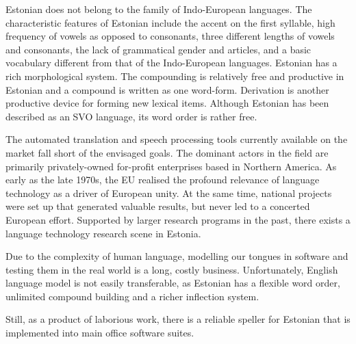 \begin{multicols}{2}
Estonian does not belong to the family of Indo-European languages. 
The characteristic features of Estonian include the accent on the ﬁrst syllable, high frequency of vowels as opposed to consonants, three different lengths of vowels and consonants, the lack of grammatical gender and articles, and a basic vocabulary different from that of the Indo-European languages. 
Estonian has a rich morphological system.
The compounding is relatively free and productive in Estonian and a compound is written as one word-form. 
Derivation is another productive device for forming new lexical items. 
Although Estonian has been described as an SVO language, its word order is rather free. 


The automated translation and speech processing tools currently available on the market fall short of the envisaged goals. The dominant actors in the field are primarily privately-owned for-profit enterprises based in Northern America. As early as the late 1970s, the EU realised the profound relevance of language technology as a driver of European unity.
At the same time, national projects were set up that generated valuable results, but never led to a concerted European effort. 
Supported by larger research programs in the past, there exists a language technology research scene in Estonia. 

Due to the complexity of human language, modelling our tongues in software and testing them in the real world is a long, costly business.
Unfortunately, English language model is not easily transferable, as Estonian has a flexible word order, unlimited compound building and a richer inflection system. 

Still, as a product of laborious work, there is a reliable speller for Estonian that is implemented into main office software suites.



\end{multicols}
